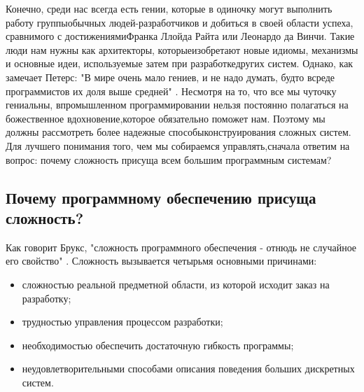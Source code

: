 \documentclass[10pt]{article}
\begin{document}
Конечно, среди нас всегда есть гении, которые в одиночку могут выполнить работу группы\linebreak  обычных людей-разработчиков и добиться в своей области успеха, сравнимого с достижениями\linebreak  Франка Ллойда Райта или Леонардо да Винчи. Такие люди нам нужны как архитекторы, которые\linebreak  изобретают новые идиомы, механизмы и основные идеи, используемые затем при разработке\linebreak  других систем. Однако, как замечает Петерс: "В мире очень мало гениев, и не надо думать, будто в\linebreak  среде программистов их доля выше средней" \cite{Peter}. Несмотря на то, что все мы чуточку гениальны, в\linebreak  промышленном программировании нельзя постоянно полагаться на божественное вдохновение,\linebreak  которое обязательно поможет нам. Поэтому мы должны рассмотреть более надежные способы\linebreak  конструирования сложных систем. Для лучшего понимания того, чем мы собираемся управлять,\linebreak  сначала ответим на вопрос: почему сложность присуща всем большим программным системам? 

\subsection{Почему программному обеспечению присуща сложность?}
Как говорит Брукс, "сложность программного обеспечения - отнюдь не случайное его свойство" \cite{No Silver Bullet}. Сложность вызывается четырьмя основными причинами: 
\begin{itemize}
\item	\hspace{0.5cm}  сложностью реальной предметной области, из которой исходит заказ на разработку;
\item   \hspace{0.5cm} трудностью управления процессом разработки;
\item	\hspace{0.5cm} необходимостью обеспечить достаточную гибкость программы;
\item	\hspace{0.5cm} неудовлетворительными способами описания поведения больших дискретных систем.
\end{itemize}
\end{document}

